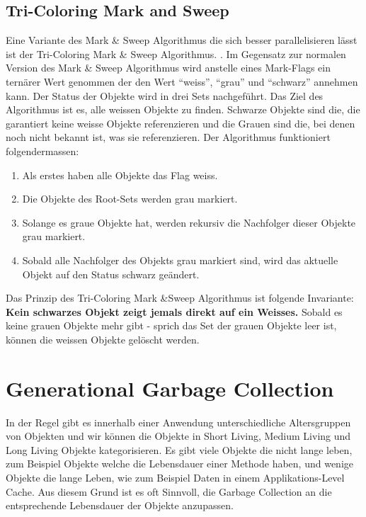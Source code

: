 \subsection{Tri-Coloring Mark and Sweep}\label{tri-coloring mark and sweep}
Eine Variante des Mark \& Sweep Algorithmus die sich besser parallelisieren lässt ist der Tri-Coloring Mark \& Sweep Algorithmus. \cite[S. 79]{lagergren2010oracle}. Im Gegensatz zur normalen Version des Mark \& Sweep Algorithmus wird anstelle eines Mark-Flags ein ternärer Wert genommen der den Wert ``weiss'', ``grau'' und ``schwarz'' annehmen kann. Der Status der Objekte wird in drei Sets nachgeführt. Das Ziel des Algorithmus ist es, alle weissen Objekte zu finden. Schwarze Objekte sind die, die garantiert keine weisse Objekte referenzieren und die Grauen sind die, bei denen noch nicht bekannt ist, was sie referenzieren. Der Algorithmus funktioniert folgendermassen:

\begin{enumerate}
	\item Als erstes haben alle Objekte das Flag weiss.
	\item Die Objekte des Root-Sets werden grau markiert.
	\item Solange es graue Objekte hat, werden rekursiv die Nachfolger dieser Objekte grau markiert.
	\item Sobald alle Nachfolger des Objekts grau markiert sind, wird das aktuelle Objekt auf den Status schwarz geändert.
\end{enumerate}

Das Prinzip des Tri-Coloring Mark \&Sweep Algorithmus ist folgende Invariante:
\textbf{Kein schwarzes Objekt zeigt jemals direkt auf ein Weisses.}
Sobald es keine grauen Objekte mehr gibt - sprich das Set der grauen Objekte leer ist, können die weissen Objekte gelöscht werden.

\section{Generational Garbage Collection}\label{generational gc}
In der Regel gibt es innerhalb einer Anwendung unterschiedliche Altersgruppen von Objekten und wir können die Objekte in Short Living, Medium Living und Long Living Objekte kategorisieren. Es gibt viele Objekte die nicht lange leben, zum Beispiel Objekte welche die Lebensdauer einer Methode haben, und wenige Objekte die lange Leben, wie zum Beispiel Daten in einem Applikations-Level Cache. Aus diesem Grund ist es oft Sinnvoll, die Garbage Collection an die entsprechende Lebensdauer der Objekte anzupassen. 

